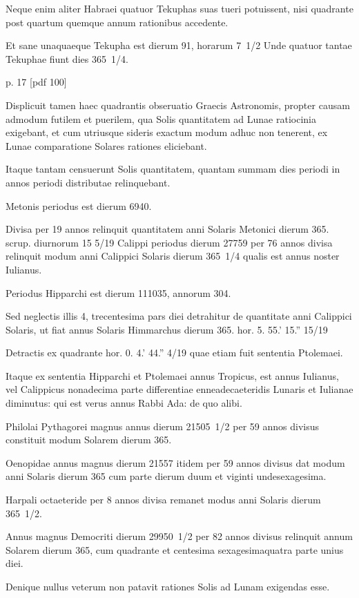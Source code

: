 Neque enim aliter Habraei quatuor Tekuphas suas tueri
potuissent, nisi quadrante post quartum quemque annum rationibus accedente.

Et sane unaquaeque Tekupha est dierum 91, horarum 7 1/2 Unde
quatuor tantae Tekuphae fiunt dies 365 1/4.


p. 17 [pdf 100]

Displicuit tamen haec quadrantis
obseruatio Graecis Astronomis, propter causam admodum futilem
et puerilem, qua Solis quantitatem ad Lunae ratiocinia exigebant,
et cum utriusque sideris exactum modum adhuc non tenerent,
ex Lunae comparatione Solares rationes eliciebant.

Itaque tantam
censuerunt Solis quantitatem, quantam summam dies periodi in annos
periodi distributae relinquebant.

Metonis periodus est dierum
6940.

Divisa per 19 annos relinquit quantitatem anni Solaris Metonici
dierum 365. scrup. diurnorum 15 5/19 Calippi periodus dierum
27759 per 76 annos divisa relinquit modum anni Calippici Solaris
dierum 365 1/4 qualis est annus noster Iulianus.

Periodus Hipparchi
est dierum 111035, annorum 304.

Sed neglectis illis 4,
trecentesima pars diei detrahitur de quantitate anni Calippici Solaris,
ut fiat annus Solaris Himmarchus
 dierum 365. hor. 5. 55.' 15.'' 15/19

Detractis ex quadrante hor. 0. 4.' 44.'' 4/19 quae etiam fuit sententia
Ptolemaei.

Itaque ex sententia Hipparchi et Ptolemaei annus
Tropicus, est annus Iulianus, vel Calippicus nonadecima parte
differentiae enneadecaeteridis Lunaris et Iulianae diminutus: qui
est verus annus Rabbi Ada: de quo alibi.

Philolai Pythagorei magnus
annus dierum 21505 1/2 per 59 annos divisus constituit modum
Solarem dierum 365.

Oenopidae annus magnus dierum 21557
itidem per 59 annos divisus dat modum anni Solaris dierum 365 cum
parte dierum duum et viginti undesexagesima.

Harpali octaeteride per
8 annos divisa remanet modus anni Solaris dierum 365 1/2.

Annus magnus
Democriti dierum 29950 1/2 per 82 annos divisus relinquit annum
Solarem dierum 365, cum quadrante et centesima sexagesimaquatra
parte unius diei.

Denique nullus veterum non patavit rationes
Solis ad Lunam exigendas esse.

